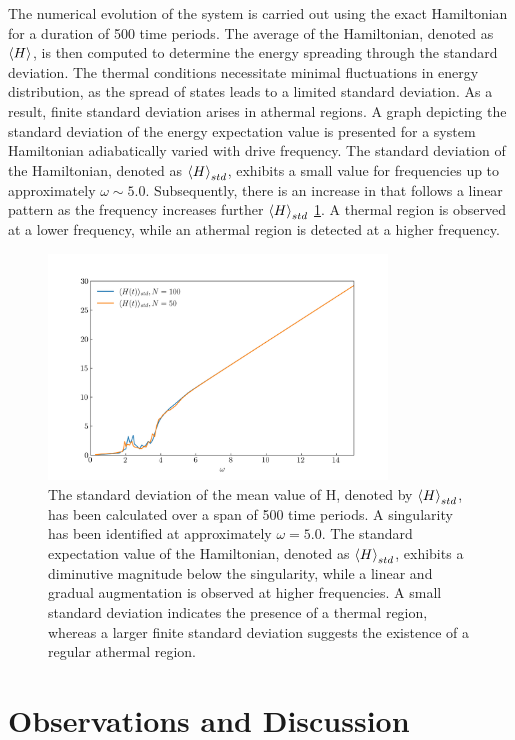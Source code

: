 \documentclass[%
reprint,
superscriptaddress,
amsmath,amssymb,
aps,
prb,
showkeys,
]{revtex4-2}
\begin{document}
	The numerical evolution of the system is carried out using the exact Hamiltonian for a duration of 500 time periods. The average of the Hamiltonian, denoted as $\expval{H}$, is then computed to determine the energy spreading through the standard deviation. The thermal conditions necessitate minimal fluctuations in energy distribution, as the spread of states leads to a limited standard deviation\cite{reimann_symmetry-prohibited_2021}. As a result, finite standard deviation arises in athermal regions. A graph depicting the standard deviation of the energy expectation value is presented for a system Hamiltonian adiabatically varied with drive frequency. The standard deviation of the Hamiltonian, denoted as $\expval{H}_{std}$, exhibits a small value for frequencies up to approximately $\omega \sim 5.0$. Subsequently, there is an increase in  that follows a linear pattern as the frequency increases further $\expval{H}_{std}$ \ref{fig:havg_std}. A thermal region is observed at a lower frequency, while an athermal region is detected at a higher frequency.
	
	\begin{figure}[!ht]
		\centering
		\includegraphics[width = 9.0cm]{hbar_std.jpg}
		\caption{The standard deviation of the mean value of H, denoted by $\expval{H}_{std}$, has been calculated over a span of 500 time periods. A singularity has been identified at approximately $\omega = 5.0$. The standard expectation value of the Hamiltonian, denoted as $\expval{H}_{std}$, exhibits a diminutive magnitude below the singularity, while a linear and gradual augmentation is observed at higher frequencies. A small standard deviation indicates the presence of a thermal region, whereas a larger finite standard deviation suggests the existence of a regular athermal region.}
		\label{fig:havg_std}
	\end{figure}
	
	
	\section{\label{sec:level6}Observations and Discussion}
	
\end{document}
